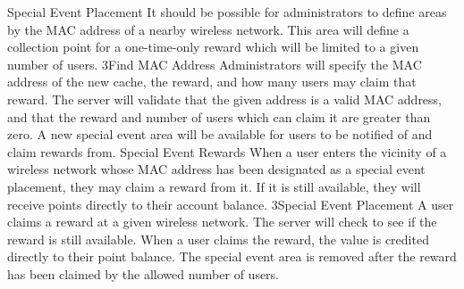 		\funcreq
			{Special Event Placement}
			{It should be possible for administrators to define areas by the 
			MAC address of a nearby wireless network. This area will define a 
			collection point for a one-time-only reward which will be limited 
			to a given number of users.}
			{3}{Find MAC Address}
			{Administrators will specify the MAC address of the new cache, the 
			reward, and how many users may claim that reward.}
			{The server will validate that the given address is a valid MAC 
			address, and that the reward and number of users which can claim 
			it are greater than zero.}
			{A new special event area will be available for users to be 
			notified of and claim rewards from.}
		\funcreq
			{Special Event Rewards}
			{When a user enters the vicinity of a wireless network whose MAC 
			address has been designated as a special event placement, they may 
			claim a reward from it. If it is still available, they will 
			receive points directly to their account balance.}
			{3}{Special Event Placement}
			{A user claims a reward at a given wireless network.}
			{The server will check to see if the reward is still available.}
			{When a user claims the reward, the value is credited directly to 
			their point balance. The special event area is removed after the 
			reward has been claimed by the allowed number of users.}
